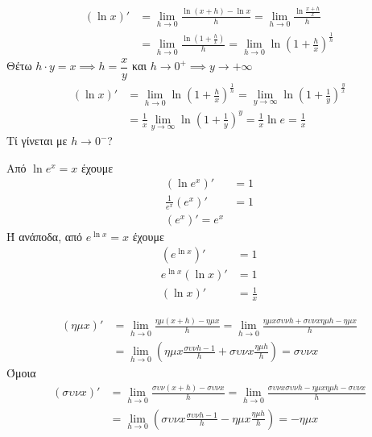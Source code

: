 \documentclass{presentation}
\begin{document}
\begin{apodiksi}[$(\ln x)'=\frac{1}{x}$]
    \begin{align*}
        (\ln x)' & =\lim\limits_{h \to 0}{ \frac{\ln (x+h) - \ln x}{h}}=\lim\limits_{h \to 0}{ \frac{\ln \frac{x+h}{x}}{h}}         \\
                 & =\lim\limits_{h \to 0}{ \frac{\ln (1+\frac{h}{x})}{h}}=\lim\limits_{h \to 0}{ \ln (1+\frac{h}{x})^{\frac{1}{h}}}
    \end{align*}
    Θέτω $h\cdot y=x\implies h=\dfrac{x}{y}$ και $h\to 0^+ \implies y\to +\infty$
    \begin{align*}
        (\ln x)' & =\lim\limits_{h \to 0}{ \ln (1+\frac{h}{x})^{\frac{1}{h}}}=\lim\limits_{y \to \infty}{ \ln (1+\frac{1}{y})^{\frac{y}{x}}} \\
                 & =\frac{1}{x}\lim\limits_{y \to \infty}{ \ln (1+\frac{1}{y})^y}=\frac{1}{x}\ln e=\frac{1}{x}
    \end{align*}
    Τί γίνεται με $h\to 0^-$?
    \hyperlink{Θεωρία}{}
\end{apodiksi}

\begin{apodiksi}
    Από $\ln e^x=x$ έχουμε
    \begin{align*}
        \left( \ln e^x \right)'          & =1 \\
        \frac{1}{e^x}\left( e^x \right)' & =1 \\
        \left( e^x \right)' = e^x
    \end{align*}
    Ή ανάποδα, από $e^{\ln x}=x$ έχουμε
    \begin{align*}
        \left( e^{\ln x} \right)'      & =1           \\
        e^{\ln x}\left( \ln x \right)' & =1           \\
        \left( \ln x \right)'          & =\frac{1}{x}
    \end{align*}
    \hyperlink{Θεωρία}{}
\end{apodiksi}

\begin{apodiksi}[$(ημx)'=συνx$ και $(συνx)'=-ημx$]
    \begin{align*}
        (ημ x)' & =\lim\limits_{h \to 0}{ \frac{ημ (x+h) - ημ x}{h}}=\lim\limits_{h \to 0}{ \frac{ημ x συν h + συν x ημ h - ημx}{h}} \\
                & =\lim\limits_{h \to 0}{ \left( ημx\frac{συνh-1}{h}+συνx\frac{ημh}{h} \right) }=συνx
    \end{align*}
    Όμοια
    \begin{align*}
        (συν x)' & =\lim\limits_{h \to 0}{ \frac{συν (x+h) - συν x}{h}}=\lim\limits_{h \to 0}{ \frac{συν x συν h - ημ x ημ h - συνx}{h}} \\
                 & =\lim\limits_{h \to 0}{ \left( συνx\frac{συνh-1}{h}-ημx\frac{ημh}{h} \right) }=-ημx
    \end{align*}
    \hyperlink{Θεωρία}{}
\end{apodiksi}
\end{document}
